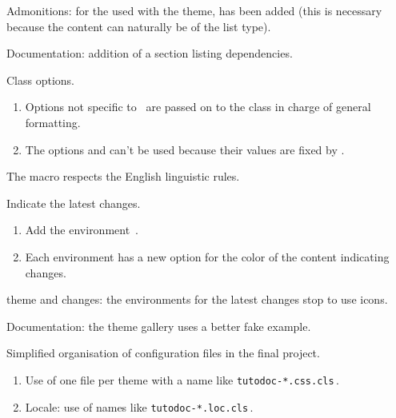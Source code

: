 \begin{tdocfix}
	\item Admonitions: for the  used with the  theme,  has been added (this is necessary because the content can naturally be of the list type).
\end{tdocfix}


\begin{tdocnew}
	\item Documentation: addition of a section listing dependencies.

	\item Class options.
	\begin{enumerate}
		\item Options not specific to \thisproj\ are passed on to the class in charge of general formatting.

		\item The  options  and  can't be used because their values are fixed by \thisproj.
	\end{enumerate}

	\item The macro  respects the English linguistic rules.

	\item Indicate the latest changes.
	\begin{enumerate}
		\item Add the environment \,.

		\item Each environment has a new option  for the color of the content indicating changes.
	\end{enumerate}
\end{tdocnew}


\begin{tdocupdate}
	\item {} theme and changes: the environments for the latest changes stop to use icons.

	\item Documentation: the theme gallery uses a better fake example.
\end{tdocupdate}



\begin{tdoctech}
	\item Simplified organisation of configuration files in the final project.
	\begin{enumerate}
		\item Use of one file per theme with a name like \texttt{tutodoc-*.css.cls}\,.

		\item Locale: use of names like \texttt{tutodoc-*.loc.cls}\,.
	\end{enumerate}
\end{tdoctech}


